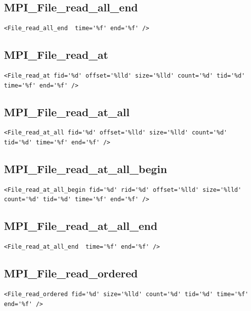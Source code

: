 \documentclass[a4paper,12pt,pdftex]{scrartcl}
\begin{document}
\subsection{MPI\_File\_read\_all\_end}
\begin{lstlisting}
<File_read_all_end  time='%f' end='%f' />
\end{lstlisting}

\subsection{MPI\_File\_read\_at}
\begin{lstlisting}
<File_read_at fid='%d' offset='%lld' size='%lld' count='%d' tid='%d' time='%f' end='%f' />
\end{lstlisting}

\subsection{MPI\_File\_read\_at\_all}
\begin{lstlisting}
<File_read_at_all fid='%d' offset='%lld' size='%lld' count='%d' tid='%d' time='%f' end='%f' />
\end{lstlisting}

\subsection{MPI\_File\_read\_at\_all\_begin}
\begin{lstlisting}
<File_read_at_all_begin fid='%d' rid='%d' offset='%lld' size='%lld' count='%d' tid='%d' time='%f' end='%f' />
\end{lstlisting}

\subsection{MPI\_File\_read\_at\_all\_end}
\begin{lstlisting}
<File_read_at_all_end  time='%f' end='%f' />
\end{lstlisting}

\subsection{MPI\_File\_read\_ordered}
\begin{lstlisting}
<File_read_ordered fid='%d' size='%lld' count='%d' tid='%d' time='%f' end='%f' />
\end{lstlisting}
\end{document}
